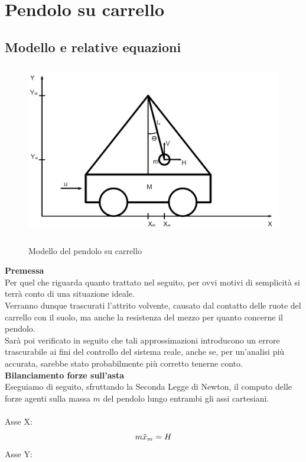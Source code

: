 \chapter{Pendolo su carrello}\label{PendCarrello}
\section{Modello e relative equazioni}\label{equazioni}
\begin{figure}[ht]
	\centering
	\includegraphics[height=75mm]{pendolo1.png}\\
	\caption{Modello del pendolo su carrello}
	\label{pendolo}
\end{figure}
\noindent\textbf{Premessa}\\
Per quel che riguarda quanto trattato nel seguito, per ovvi motivi di semplicità si terrà conto di una situazione ideale.\\
Verranno dunque trascurati l'attrito volvente, causato dal contatto delle ruote del carrello con il suolo, ma anche la resistenza del mezzo per quanto concerne il pendolo.\\
Sarà poi verificato in seguito che tali approssimazioni introducono un errore trascurabile ai fini del controllo del sistema reale, anche se, per un'analisi più accurata, sarebbe stato probabilmente più corretto tenerne conto.\\
\textbf{Bilanciamento forze sull'asta}\\
Eseguiamo di seguito, sfruttando la Seconda Legge di Newton, il computo delle forze agenti sulla massa $m$ del pendolo lungo entrambi gli assi cartesiani.\\\\
Asse X:
\begin{equation}\notag
m\ddot{x}_m=H
\end{equation}
Asse Y:
